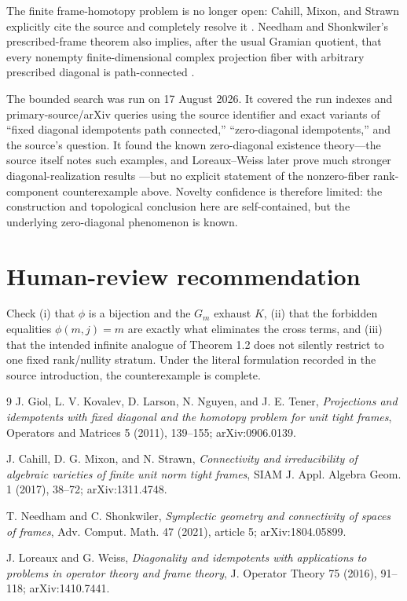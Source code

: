 \documentclass[11pt]{article}
\begin{document}
The finite frame-homotopy problem is no longer open: Cahill, Mixon, and Strawn
explicitly cite the source and completely resolve it \cite{CMS}.  Needham and
Shonkwiler's prescribed-frame theorem also implies, after the usual Gramian
quotient, that every nonempty finite-dimensional complex projection fiber with
arbitrary prescribed diagonal is path-connected \cite{NS}.

The bounded search was run on 17 August 2026.  It covered the run indexes and
primary-source/arXiv queries using the source identifier and exact variants of
``fixed diagonal idempotents path connected,'' ``zero-diagonal idempotents,''
and the source's question.  It found the known zero-diagonal existence
theory---the source itself notes such examples, and Loreaux--Weiss later prove
much stronger diagonal-realization results \cite{LW}---but no explicit
statement of the nonzero-fiber rank-component counterexample above.  Novelty
confidence is therefore limited: the construction and topological conclusion
here are self-contained, but the underlying zero-diagonal phenomenon is known.

\section*{Human-review recommendation}

Check (i) that $\phi$ is a bijection and the $G_m$ exhaust $K$,
(ii) that the forbidden equalities $\phi(m,j)=m$ are exactly what eliminates
the cross terms, and (iii) that the intended infinite analogue of Theorem 1.2
does not silently restrict to one fixed rank/nullity stratum.  Under the
literal formulation recorded in the source introduction, the counterexample
is complete.

\begin{thebibliography}{9}
J. Giol, L. V. Kovalev, D. Larson, N. Nguyen, and J. E. Tener,
\emph{Projections and idempotents with fixed diagonal and the homotopy
problem for unit tight frames}, Operators and Matrices 5 (2011), 139--155;
arXiv:0906.0139.

J. Cahill, D. G. Mixon, and N. Strawn,
\emph{Connectivity and irreducibility of algebraic varieties of finite unit
norm tight frames}, SIAM J. Appl. Algebra Geom. 1 (2017), 38--72;
arXiv:1311.4748.

T. Needham and C. Shonkwiler,
\emph{Symplectic geometry and connectivity of spaces of frames},
Adv. Comput. Math. 47 (2021), article 5; arXiv:1804.05899.

J. Loreaux and G. Weiss,
\emph{Diagonality and idempotents with applications to problems in operator
theory and frame theory}, J. Operator Theory 75 (2016), 91--118;
arXiv:1410.7441.
\end{thebibliography}
\end{document}
